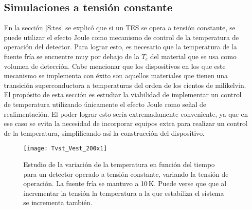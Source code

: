 \subsection{Simulaciones a tensión constante}\label{ss:Vcte}
En la sección \ref{S:tes} se explicó que si un TES se  opera a tensión constante, se puede utilizar el efecto Joule como mecanismo de control de la temperatura de operación del detector. Para lograr esto, es necesario que la temperatura de la fuente fría se encuentre muy por debajo de la $T_c$ del material que se usa como volumen de detección. Cabe mencionar que los dispositivos en los que este mecanismo se implementa con éxito son aquellos materiales que tienen una transición superconductora a temperaturas del orden de los cientos de milikelvin. El propósito de esta sección es estudiar la viabilidad de implementar un control de temperatura utilizando únicamente el efecto Joule como señal de realimentación. El poder lograr esto sería extremadamente conveniente, ya que en ese caso se evita la necesidad de incorporar equipos extra para realizar un control de la temperatura, simplificando así la construcción del dispositivo.
 \begin{figure}[tbh!]
   \begin{center}
	 \texttt{[image: Tvst\_Vest\_200x1]}
   \end{center}
   \caption[Estudio de la variación de la temperatura en función del tiempo para un detector operado a tensión constante, variando la tensión de operación.]{Estudio de la variación de la temperatura en función del tiempo para un detector operado a tensión constante, variando la tensión de operación. La fuente fría se mantuvo a 10\,K. Puede verse que que al incrementar la tensión la temperatura a la que estabiliza el sistema se incrementa tambi\'en.}
   \label{fig:TvstxV}
 \end{figure}

